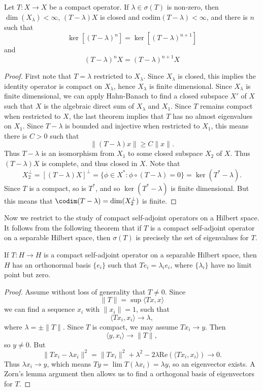 \begin{corollary}
    Let $T: X \to X$ be a compact operator. If $\lambda \in \sigma(T)$ is non-zero, then $\dim(X_\lambda) < \infty$, $(T - \lambda)X$ is closed and $\text{codim}(T - \lambda) < \infty$, and there is $n$ such that
    \[ \ker[(T - \lambda)^n] = \ker[(T - \lambda)^{n+1}] \]
    and
    \[ (T - \lambda)^n X = (T - \lambda)^{n+1} X \]
\end{corollary}
\begin{proof}
    First note that $T = \lambda$ restricted to $X_\lambda$. Since $X_\lambda$ is closed, this implies the identity operator is compact on $X_\lambda$, hence $X_\lambda$ is finite dimensional. Since $X_\lambda$ is finite dimensional, we can apply Hahn-Banach to find a closed subspace $X'$ of $X$ such that $X$ is the algebraic direct sum of $X_\lambda$ and $X_1$. Since $T$ remains compact when restricted to $X$, the last theorem implies that $T$ has no almost eigenvalues on $X_1$. Since $T - \lambda$ is bounded and injective when restricted to $X_1$, this means there is $C > 0$ such that
    \[ \| (T - \lambda) x \| \geq C \| x \|. \]
    Thus $T - \lambda$ is an isomorphism from $X_1$ to some closed subspace $X_2$ of $X$. Thus $(T - \lambda) X$ is complete, and thus closed in $X$. Note that
    \[ X_2^\perp = [(T - \lambda)X]^\perp = \{ \phi \in X^*: \phi \circ (T - \lambda) = 0 \} = \ker( T^* - \lambda). \]
    Since $T$ is a compact, so is $T^*$, and so $\ker(T^* - \lambda)$ is finite dimensional. But this means that $\codim(T - \lambda) = \dim(X_2^\perp)$ is finite.
\end{proof}

Now we restrict to the study of compact self-adjoint operators on a Hilbert space. It follows from the following theorem that if $T$ is a compact self-adjoint operator on a separable Hilbert space, then $\sigma(T)$ is precisely the set of eigenvalues for $T$.

\begin{theorem}
    If $T: H \to H$ is a compact self-adjoint operator on a separable Hilbert space, then $H$ has an orthonormal basis $\{ e_i \}$ such that $Te_i = \lambda_i e_i$, where $\{ \lambda_i \}$ have no limit point but zero.
\end{theorem}
\begin{proof}
    Assume without loss of generality that $T \neq 0$. Since
    \[ \| T \| = \sup \langle Tx, x \rangle \]
    we can find a sequence $x_i$ with $\| x_i \| = 1$, such that
    \[ \langle Tx_i, x_i \rangle \to \lambda, \]
    where $\lambda = \pm \| T \|$. Since $T$ is compact, we may assume $Tx_i \to y$. Then
    \[ \langle y, x_i \rangle \to \| T \|, \]
    so $y \neq 0$. But
    \[ \| Tx_i - \lambda x_i \|^2 = \| Tx_i \|^2 + \lambda^2 - 2 \lambda \text{Re}( \langle Tx_i, x_i \rangle ) \to 0. \]
    Thus $\lambda x_i \to y$, which means $T y = \lim T(\lambda x_i) = \lambda y$, so an eigenvector exists. A Zorn's lemma argument then allows us to find a orthogonal basis of eigenvectors for $T$.
\end{proof}

